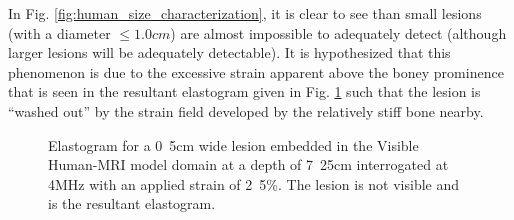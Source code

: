 			In Fig. \ref{fig:human_size_characterization}, it is clear to see than small lesions (with a diameter $\leq \unit{1.0}{cm}$) are almost impossible to adequately detect (although larger lesions will be adequately detectable). It is hypothesized that this phenomenon is due to the excessive strain apparent above the boney prominence that is seen in the resultant elastogram given in Fig. \ref{fig:human_elastogram} such that the lesion is ``washed out'' by the strain field developed by the relatively stiff bone nearby.

			\begin{figure}[!t]
				\centering
				\caption[Elastogram of a Visible Human-MRI model]{Elastogram for a \unit{0.5}{cm} wide lesion embedded in the Visible Human-MRI model domain at a depth of \unit{7.25}{cm} interrogated at \unit{4}{MHz} with an applied strain of \unit{2.5}{\%}. The lesion is not visible and is the resultant elastogram.}
				\label{fig:human_elastogram}
			\end{figure}

